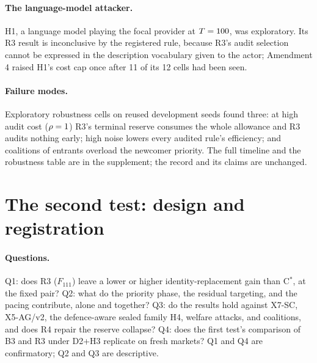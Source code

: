 \documentclass[11pt]{article}
\begin{document}
\paragraph{The language-model attacker.} H1, a language model playing the focal provider at $T = 100$, was exploratory. Its R3 result is inconclusive by the registered rule, because R3's audit selection cannot be expressed in the description vocabulary given to the actor; Amendment 4 raised H1's cost cap once after 11 of its 12 cells had been seen.

\paragraph{Failure modes.} Exploratory robustness cells on reused development seeds found three: at high audit cost ($\rho = 1$) R3's terminal reserve consumes the whole allowance and R3 audits nothing early; high noise lowers every audited rule's efficiency; and coalitions of entrants overload the newcomer priority. The full timeline and the robustness table are in the supplement; the record and its claims are unchanged.

\section{The second test: design and registration}\label{sec:design}
\paragraph{Questions.} Q1: does R3 ($F_{111}$) leave a lower or higher identity-replacement gain than C$^*$, at the fixed pair? Q2: what do the priority phase, the residual targeting, and the pacing contribute, alone and together? Q3: do the results hold against X7-SC, X5-AG/v2, the defence-aware sealed family H4, welfare attacks, and coalitions, and does R4 repair the reserve collapse? Q4: does the first test's comparison of B3 and R3 under D2+H3 replicate on fresh markets? Q1 and Q4 are confirmatory; Q2 and Q3 are descriptive.
\end{document}
